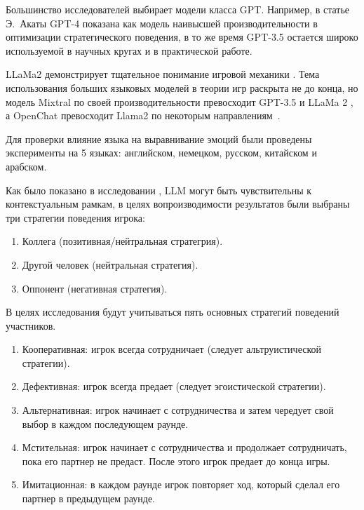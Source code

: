 Большинство исследователей выбирает модели класса GPT. Например, в статье Э.~Акаты \cite{akata2023playing} GPT-4 показана как модель наивысшей производительности в оптимизации стратегического поведения, в то же время GPT-3.5 остается широко используемой в научных кругах и в практической работе. 

LLaMa2 демонстрирует тщательное понимание игровой механики \cite{lore2023strategic}. Тема использования больших языковых моделей в теории игр раскрыта не до конца, но модель Mixtral по своей производительности превосходит GPT-3.5 и LLaMa 2 \cite{jiang2024mixtral}, а OpenChat превосходит Llama2 по некоторым направлениям~\cite{wang2023openchat}.

Для проверки влияние языка на выравнивание эмоций были проведены эксперименты на 5 языках: английском, немецком, русском, китайском и арабском.

Как было показано в исследовании \cite{lore2023strategic}, LLM могут быть чувствительны к контекстуальным рамкам, в целях вопроизводимости результатов были выбраны три стратегии поведения игрока:
\begin{enumerate}[label=\arabic*)] %
	\item Коллега (позитивная/нейтральная стратегрия).
	\item Другой человек (нейтральная стратегия).
	\item Оппонент (негативная стратегия).
\end{enumerate}

В целях исследования будут учитываться пять основных стратегий поведений участников.

\begin{enumerate}[label=\arabic*)] %
\item Кооперативная: игрок всегда сотрудничает (следует альтруистической стратегии).
\item Дефективная: игрок всегда предает (следует эгоистической стратегии).
\item Альтернативная: игрок начинает с сотрудничества и затем чередует свой выбор в каждом последующем раунде.
\item Мстительная: игрок начинает с сотрудничества и продолжает сотрудничать, пока его партнер не предаст. После этого игрок предает до конца игры.
\item Имитационная: в каждом раунде игрок повторяет ход, который сделал его партнер в предыдущем раунде.
\end{enumerate}

